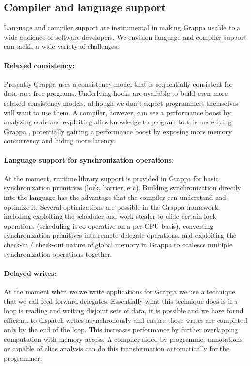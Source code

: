 \subsection{Compiler and language support}

Language and compiler support are instrumental in making Grappa usable to a wide audience of software developers. We envision language and compiler support can tackle a wide variety of challenges:

\paragraph{Relaxed consistency:} Presently Grappa uses a consistency model that is sequentially consistent for data-race free programs.  Underlying hooks are available to build even more relaxed consistency models, although we don't expect programmers themselves will want to use them.  A compiler, however, can see a performance boost by analyzing code and exploiting alias knowledge to program to this underlying Grappa \api, potentially gaining a performance boost by exposing more memory concurrency and hiding more latency.

\paragraph{Language support for synchronization operations: } At the moment, runtime library support is provided in Grappa for basic synchronization primitives (lock, barrier, etc).  Building synchronization directly into the language has the advantage that the compiler can understand and optimize it.  Several optimizations are possible in the Grappa framework, including exploiting the scheduler and work stealer to elide certain lock operations (scheduling is co-operative on a per-CPU basis), converting synchronization primitives into remote delegate operations, and exploiting the check-in / check-out nature of global memory in Grappa to coalesce multiple synchronization operations together.

\paragraph{Delayed writes: } At the moment when we we write applications for Grappa we use a technique that we call feed-forward delegates.  Essentially what this technique does is if a loop is reading and writing disjoint sets of data, it is possible and we have found efficient, to dispatch writes asynchronously and ensure those writes are completed only by the end of the loop.  This increases performance by further overlapping computation with memory access.  A compiler aided by programmer annotations or capable of alias analysis can do this transformation automatically for the programmer.

